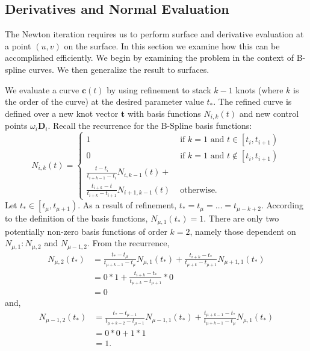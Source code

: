 \documentclass[acmtog]{acmart}
\begin{document}
\subsection{Derivatives and Normal Evaluation}
\hspace*{8pt}
The Newton iteration requires us to perform surface and derivative evaluation at a point $(u, v)$ on the surface. In this section we examine how this can be accomplished efficiently. We begin by examining the problem in the context of B-spline curves. We then generalize the result to surfaces.

We evaluate a curve $\mathbf{c}(t)$ by using refinement to stack $k-1$ knots (where $k$ is the order of the curve) at the desired parameter value $t_*$. The refined curve is defined over a new knot vector $\mathbf{t}$ with basis functions $N_{i, k}(t)$ and new control points $\omega_i \mathbf{D}_i$. Recall the recurrence for the B-Spline basis functions:
$$
N_{i, k}(t)=\left\{\begin{array}{cl}
1 & \text { if } k=1 \text { and } t \in\left[t_i, t_{i+1}\right) \\
0 & \text { if } k=1 \text { and } t \notin\left[t_i, t_{i+1}\right) \\
\frac{t-t_i}{t_{i+k-1}-t_i} N_{i, k-1}(t)+\\
\frac{t_{i+k}-t}{t_{i+k}-t_{i+1}} N_{i+1, k-1}(t) & \text { otherwise. }
\end{array}\right.
$$
Let $t_* \in\left[t_\mu, t_{\mu+1}\right)$. As a result of refinement, $t_*=t_\mu=\ldots=t_{\mu-k+2}$. According to the definition of the basis functions, $N_{\mu, 1}\left(t_*\right)=1$. There are only two potentially non-zero basis functions of order $k=2$, namely those dependent on $N_{\mu, 1}: N_{\mu, 2}$ and $N_{\mu-1,2}$. From the recurrence,
$$
\begin{aligned}
N_{\mu, 2}\left(t_*\right) & =\frac{t_*-t_\mu}{t_{\mu+k-1}-t_\mu} N_{\mu, 1}\left(t_*\right)+\frac{t_{i+k}-t_*}{t_{\mu+k}-t_{\mu+1}} N_{\mu+1,1}\left(t_*\right) \\
& =0 * 1+\frac{t_{i+k}-t_*}{t_{\mu+k}-t_{\mu+1}} * 0 \\
& =0
\end{aligned}
$$
and,
$$
\begin{aligned}
N_{\mu-1,2}\left(t_*\right) & =\frac{t_*-t_{\mu-1}}{t_{\mu+k-2}-t_{\mu-1}} N_{\mu-1,1}\left(t_*\right)+\frac{t_{\mu+k-1}-t_*}{t_{\mu+k-1}-t_\mu} N_{\mu, 1}\left(t_*\right) \\
& =0 * 0+1 * 1 \\
& =1 .
\end{aligned}
$$
\end{document}
